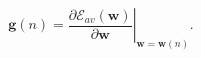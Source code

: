 \begin{equation}
\label{eq:gradientvector}
\mathbf{g}(\mathit{n}) = 
\left. \frac{\partial \mathscr{E}_{av}(\mathbf{w})}{\partial
\mathbf{w}}\right|_{\mathbf{w}=\mathbf{w}(\mathit{n})} .
\end{equation}
